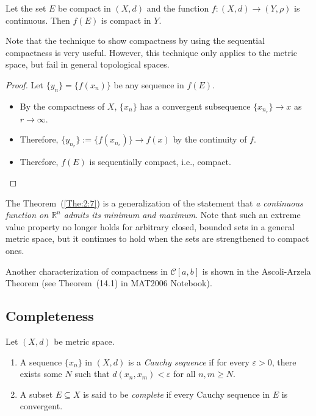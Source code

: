 \begin{theorem}\label{The:2:7}
Let the set $E$ be compact in $(X,d)$ and the function $f:(X,d)\to (Y,\rho)$ is continuous. Then $f(E)$ is compact in $Y$.
\end{theorem}

Note that the technique to show compactness by using the sequential compactness is very useful. However, this technique only applies to the metric space, but fail in general topological spaces.
\begin{proof}
Let $\{y_n\}=\{f(x_n)\}$ be any sequence in $f(E)$.
\begin{itemize}
\item
By the compactness of $X$, $\{x_n\}$ has a convergent subsequence $\{x_{n_r}\}\to x$ as $r\to\infty$.
\item
Therefore, $\{y_{n_r}\}:=\{f(x_{n_r})\}\to f(x)$ by the continuity of $f$.
\item
Therefore, $f(E)$ is sequentially compact, i.e., compact.
\end{itemize}
\end{proof}

\begin{remark}
The Theorem~(\ref{The:2:7}) is a generalization of the statement that \textit{a continuous function on $\mathbb{R}^n$ admits its minimum and maximum}. Note that such an extreme value property no longer holds for arbitrary closed, bounded sets in a general metric space, but it continues to hold when the sets are strengthened to compact ones.

Another characterization of compactness in $\mathcal{C}[a,b]$ is shown in the Ascoli-Arzela Theorem (see Theorem~(14.1) in MAT2006 Notebook).
\end{remark}

\subsection{Completeness}
\begin{definition}[Complete]
Let $(X,d)$ be metric space.
\begin{enumerate}
\item
A sequence $\{x_n\}$ in $(X,d)$ is a \emph{Cauchy sequence} if for every $\varepsilon>0$, there exists some $N$ such that $d(x_n,x_m)<\varepsilon$ for all $n,m\ge N$.
\item
A subset $E\subseteq X$ is said to be \emph{complete} if every Cauchy sequence in $E$ is convergent.
\end{enumerate}
\end{definition}

